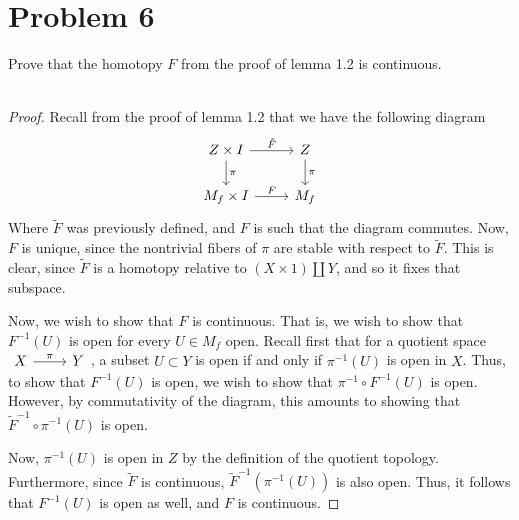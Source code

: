 \documentclass[fontsize=11pt]{scrartcl} %
\numberwithin{equation}{section} %
\numberwithin{figure}{section} %
\numberwithin{table}{section} %
\begin{document}
\section*{Problem 6}
Prove that the homotopy $F$ from the proof of lemma 1.2 is continuous.
\\
\\
\begin{proof}
Recall from the proof of lemma 1.2 that we have the following diagram
    \[
        \begin{tikzcd}
            Z\times I \arrow{r}{\tilde{F}}\arrow{d}{\pi} & Z\arrow{d}{\pi}\\
            M_f\times I\arrow{r}{F} & M_f
        \end{tikzcd}
    \]
    Where $\tilde{F}$ was previously defined, and $F$ is such that the diagram
    commutes. Now, $F$ is unique, since the nontrivial fibers of $\pi$ are stable with
    respect to $\tilde{F}$.  This is clear, since $\tilde{F}$ is a homotopy
    relative to $(X\times 1)\coprod Y$, and so it fixes that subspace.

    Now, we wish to show that $F$ is continuous. That is, we wish to show that
    $F^{-1}(U)$ is open for every $U\in M_f$ open.
    Recall first that for a quotient space $\begin{tikzcd}X\arrow{r}{\pi}
    &Y\end{tikzcd}$, a
    subset $U\subset Y$ is open if and only if $\pi^{-1}(U)$ is open in $X$.
    Thus, to show that $F^{-1}(U)$ is open, we wish to show that
    $\pi^{-1}\circ F^{-1}(U)$ is open. However, by commutativity of the diagram,
    this amounts to showing that $\tilde{F}^{-1}\circ\pi^{-1}(U)$ is open.

    Now, $\pi^{-1}(U)$ is open in $Z$ by the definition of the quotient
    topology. Furthermore, since $\tilde{F}$ is continuous,
    $\tilde{F}^{-1}(\pi^{-1}(U))$ is also open. Thus, it follows that
    $F^{-1}(U)$ is open as well, and $F$ is continuous.
\end{proof}

\newpage
\end{document}
